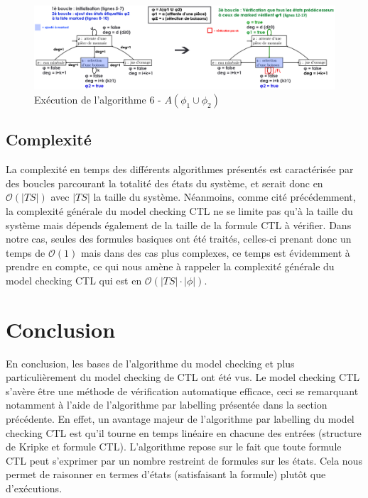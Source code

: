 \documentclass[runningheads,a4paper,10pt]{llncs}
\begin{document}
\begin{figure}
  \centering
   \includegraphics[scale=0.38]{figures/algo-graph-AU.png}
   \caption[Caption for LOF]{Exécution de l'algorithme 6 - $A(\phi_{1} \cup \phi_{2})$}
   \label{fig:algo-graph-AU}
\end{figure} 


\subsection{Complexité}

La complexité en temps des différents algorithmes présentés est caractérisée par des boucles parcourant la totalité des états du système, et serait donc en $\mathcal{O}(|TS|)$ avec $|TS|$ la taille du système. Néanmoins, comme cité précédemment, la complexité générale du model checking CTL ne se limite pas qu'à la taille du système mais dépends également de la taille de la formule CTL à vérifier. Dans notre cas, seules des formules basiques ont été traités, celles-ci prenant donc un temps de  $\mathcal{O}(1)$ mais dans des cas plus complexes, ce temps est évidemment à prendre en compte, ce qui nous amène à rappeler la complexité générale du model checking CTL qui est en $\mathcal{O}(|TS| \cdot |\phi|)$. \\


\section{Conclusion}

En conclusion, les bases de l'algorithme du model checking et plus particulièrement du model checking de CTL ont été vus. Le model checking CTL s'avère être une méthode de vérification automatique efficace, ceci se remarquant notamment à l'aide de l'algorithme par labelling présentée dans la section précédente. En effet, un avantage majeur de l'algorithme par labelling du model checking CTL est qu'il tourne en temps linéaire en chacune des entrées (structure de Kripke et formule CTL). L’algorithme repose sur le fait que toute formule CTL peut s’exprimer par un nombre restreint de formules sur les états. Cela nous permet de raisonner en termes d'états (satisfaisant la formule) plutôt que d’exécutions. \\
\end{document}
